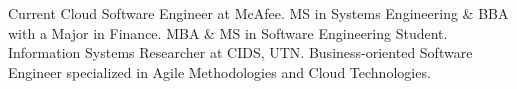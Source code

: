 

\begin{cvparagraph}

Current Cloud Software Engineer at McAfee. MS in Systems Engineering \& BBA with a Major in Finance. MBA \& MS in Software Engineering Student. Information Systems Researcher at CIDS, UTN. Business-oriented Software Engineer specialized in Agile Methodologies and Cloud Technologies.
\end{cvparagraph}
